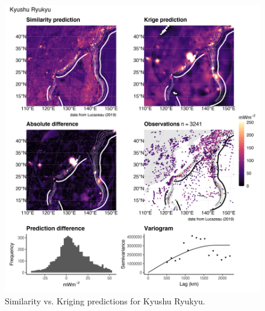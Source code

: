 \documentclass[draft,linenumbers]{agujournal2018}
\begin{document}
\begin{figure}[h]

{\centering \includegraphics[width=0.95\linewidth,]{../figs/diff/comp/Kyushu_Ryukyu} 

}

\caption{Similarity vs. Kriging predictions for Kyushu Ryukyu.}\label{fig:kyushu.ryukyu.comp}
\end{figure}
\end{document}
